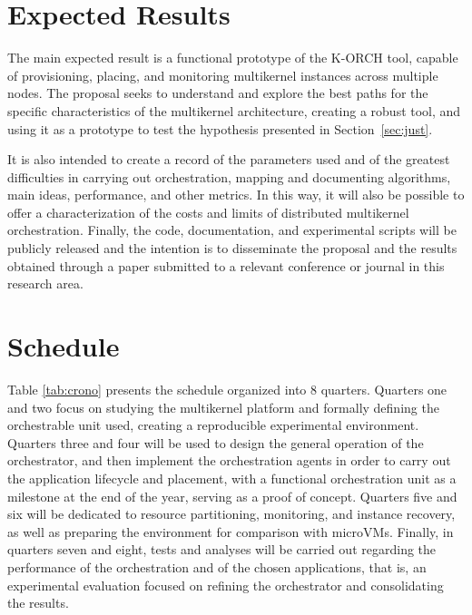 \documentclass[12pt]{article}
\begin{document}
\section{Expected Results} \label{sec:results}

The main expected result is a functional prototype of the K-ORCH tool, capable of provisioning, placing, and monitoring multikernel
instances across multiple nodes.
The proposal seeks to understand and explore the best paths for the specific characteristics of the multikernel architecture, creating
a robust tool, and using it as a prototype to test the hypothesis presented in Section~\ref{sec:just}.

It is also intended to create a record of the parameters used and of the greatest difficulties in carrying out orchestration,
mapping and documenting algorithms, main ideas, performance, and other metrics.
In this way, it will also be possible to offer a characterization of the costs and limits of distributed multikernel orchestration.
Finally, the code, documentation, and experimental scripts will be publicly released and
the intention is to disseminate the proposal and the results obtained through a paper submitted
to a relevant conference or journal in this research area.

\section{Schedule} \label{sec:crono}

Table \ref{tab:crono} presents the schedule organized into 8 quarters.
Quarters one and two focus on studying the multikernel platform and formally defining the orchestrable unit used, creating
a reproducible experimental environment.
Quarters three and four will be used to design the general operation of the orchestrator, and then implement the orchestration
agents in order to carry out the application lifecycle and placement, with a functional orchestration unit as a milestone
at the end of the year, serving as a proof of concept.
Quarters five and six will be dedicated to resource partitioning, monitoring, and
instance recovery, as well as preparing the environment for comparison with microVMs.
Finally, in quarters seven and eight, tests and analyses will be carried out regarding the performance of the orchestration
and of the chosen applications, that is, an experimental evaluation focused on refining the orchestrator and consolidating the results.
\end{document}
